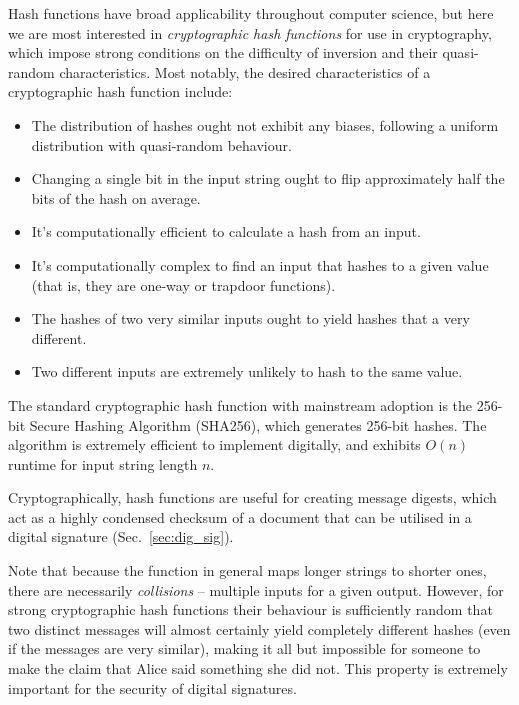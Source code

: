 Hash functions have broad applicability throughout computer science, but here we are most interested in \textit{cryptographic hash functions} for use in cryptography, which impose strong conditions on the difficulty of inversion and their quasi-random characteristics. Most notably, the desired characteristics of a cryptographic hash function include:
\begin{itemize}
	\item The distribution of hashes ought not exhibit any biases, following a uniform distribution with quasi-random behaviour.
	\item Changing a single bit in the input string ought to flip approximately half the bits of the hash on average.	
	\item It's computationally efficient to calculate a hash from an input.
	\item It's computationally complex to find an input that hashes to a given value (that is, they are one-way or trapdoor functions).
	\item The hashes of two very similar inputs ought to yield hashes that a very different.
	\item Two different inputs are extremely unlikely to hash to the same value.
\end{itemize}

The standard cryptographic hash function with mainstream adoption is the 256-bit Secure Hashing Algorithm (SHA256), which generates 256-bit hashes. The algorithm is extremely efficient to implement digitally, and exhibits $O(n)$ runtime for input string length $n$.

Cryptographically, hash functions are useful for creating message digests, which act as a highly condensed checksum of a document that can be utilised in a digital signature (Sec.~\ref{sec:dig_sig}).

Note that because the function in general maps longer strings to shorter ones, there are necessarily \textit{collisions} -- multiple inputs for a given output. However, for strong cryptographic hash functions their behaviour is sufficiently random that two distinct messages will almost certainly yield completely different hashes (even if the messages are very similar), making it all but impossible for someone to make the claim that Alice said something she did not. This property is extremely important for the security of digital signatures.

